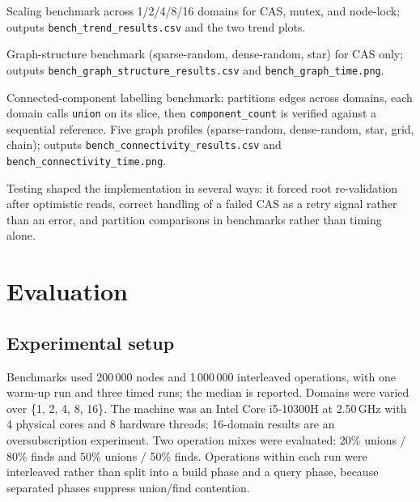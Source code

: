 \documentclass[11pt,a4paper]{article}
\begin{document}
\begin{description}[leftmargin=1.5em,labelindent=0em]
  \item[\texttt{dune exec ./union\_find\_bench.exe}] Scaling benchmark across
    1/2/4/8/16 domains for CAS, mutex, and node-lock; outputs
    \texttt{bench\_trend\_results.csv} and the two trend plots.
  \item[\texttt{dune exec ./union\_find\_graph\_bench.exe}] Graph-structure
    benchmark (sparse-random, dense-random, star) for CAS only; outputs
    \texttt{bench\_graph\_structure\_results.csv} and
    \texttt{bench\_graph\_time.png}.
  \item[\texttt{dune exec ./union\_find\_connectivity\_bench.exe}] Connected-component
    labelling benchmark: partitions edges across domains, each domain calls
    \texttt{union} on its slice, then \texttt{component\_count} is verified
    against a sequential reference.  Five graph profiles (sparse-random,
    dense-random, star, grid, chain); outputs
    \texttt{bench\_connectivity\_results.csv} and
    \texttt{bench\_connectivity\_time.png}.
\end{description}

Testing shaped the implementation in several ways: it forced root re-validation
after optimistic reads, correct handling of a failed CAS as a retry signal
rather than an error, and partition comparisons in benchmarks rather than
timing alone.

\section{Evaluation}
\label{sec:evaluation}

\subsection{Experimental setup}

Benchmarks used 200\,000 nodes and 1\,000\,000 interleaved operations, with one
warm-up run and three timed runs; the median is reported.  Domains were varied
over \{1, 2, 4, 8, 16\}.  The machine was an Intel Core i5-10300H at 2.50\,GHz
with 4 physical cores and 8 hardware threads; 16-domain results are an
oversubscription experiment.  Two operation mixes were evaluated: 20\% unions /
80\% finds and 50\% unions / 50\% finds.  Operations within each run were
interleaved rather than split into a build phase and a query phase, because
separated phases suppress union/find contention.
\end{document}
